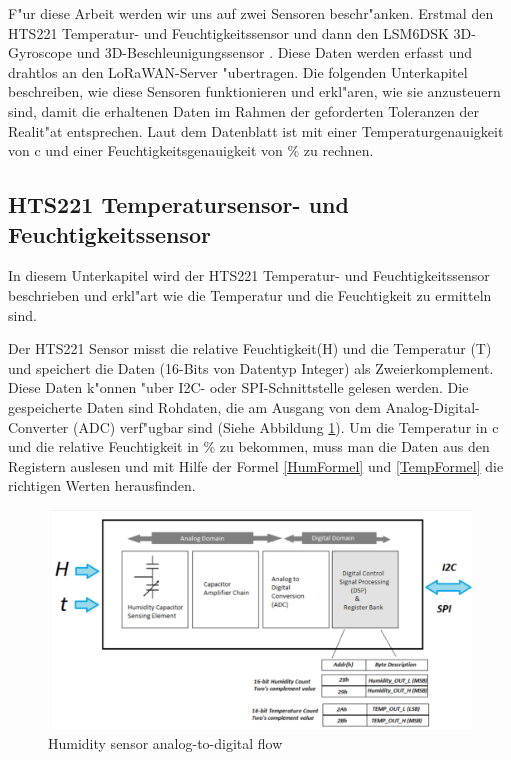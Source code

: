 F"ur diese Arbeit werden wir uns auf zwei Sensoren beschr"anken. 
Erstmal den HTS221\cite{HTS221} Temperatur- und Feuchtigkeitssensor und 
dann den LSM6DSK 3D-Gyroscope und 3D-Beschleunigungssensor 
\cite{LSM6DSL}. Diese Daten werden erfasst und drahtlos an den 
LoRaWAN-Server "ubertragen. Die folgenden Unterkapitel beschreiben, wie 
diese Sensoren funktionieren und erkl"aren, wie sie anzusteuern sind, 
damit die erhaltenen Daten im Rahmen der geforderten Toleranzen der 
Realit"at entsprechen. Laut dem Datenblatt ist mit einer 
Temperaturgenauigkeit von \textdegree{}c und einer 
Feuchtigkeitsgenauigkeit von \%   zu rechnen. 

\subsection {HTS221 Temperatursensor- und Feuchtigkeitssensor}\label{Temp}
In diesem Unterkapitel wird der HTS221 Temperatur- und 
Feuchtigkeitssensor beschrieben und erkl"art wie die Temperatur und die 
Feuchtigkeit zu ermitteln sind.

Der HTS221 Sensor misst die relative Feuchtigkeit(H) und die Temperatur 
(T) und speichert die Daten (16-Bits von Datentyp Integer) als 
Zweierkomplement. Diese Daten k"onnen "uber I2C- oder SPI-Schnittstelle 
gelesen werden. Die gespeicherte Daten sind Rohdaten, die am Ausgang 
von dem Analog-Digital-Converter (ADC) verf"ugbar sind (Siehe Abbildung 
\ref{HT_sensor}). Um die Temperatur in \textdegree{}c und die relative 
Feuchtigkeit in \% zu bekommen, muss man die Daten aus den Registern 
auslesen und mit Hilfe der Formel \ref{HumFormel} und \ref{TempFormel} 
die richtigen Werten herausfinden.

\begin{figure}[h]
	\centering
	\includegraphics[width=14cm]{source/images/HTS221_sensor}
	\caption{Humidity sensor analog-to-digital flow 
	\cite{HTS221}}\label{HT_sensor}
\end{figure}

